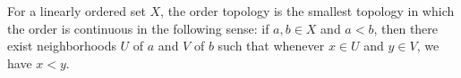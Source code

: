 For a linearly ordered set $X$, the order topology is the smallest topology in which the order is continuous in the following sense: if $a, b \in X$ and $a < b$, then there exist neighborhoods $U$ of $a$ and $V$ of $b$ such that whenever $x \in U$ and $y \in V$, we have $x < y$.
